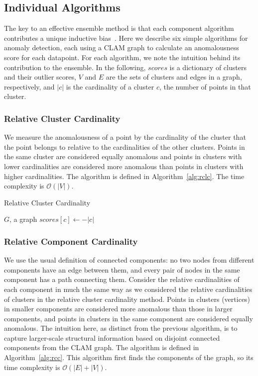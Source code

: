 \subsection{Individual Algorithms}
\label{subsec:methods:individual-algorithms}

The key to an effective ensemble method is that each component algorithm contributes a unique inductive bias~\cite{chen2017outlier}.
Here we describe six simple algorithms for anomaly detection, each using a CLAM graph to calculate an anomalousness score for each datapoint.
For each algorithm, we note the intuition behind its contribution to the ensemble.
In the following, $scores$ is a dictionary of clusters and their outlier scores,
$V$ and $E$ are the sets of clusters and edges in a graph, respectively, and $|c|$ is
the cardinality of a cluster $c$, the number of points in that cluster.


\subsubsection{Relative Cluster Cardinality}
We measure the anomalousness of a point by the cardinality of the cluster that the point belongs to relative to the cardinalities of the other clusters.
Points in the same cluster are considered equally anomalous and points in clusters with lower cardinalities are considered more anomalous than points in clusters with higher cardinalities.
The algorithm is defined in Algorithm~\ref{alg:rclc}.
The time complexity is $\mathcal{O}(|V|)$.

\begin{algorithm}[h]
    \caption{Relative Cluster Cardinality}
    \label{alg:rclc}
\begin{algorithmic}[1]
    \REQUIRE $G$, a graph
    \STATE $scores[c] \gets -|c|$
    \ENDFOR
\end{algorithmic}
\end{algorithm}


\subsubsection{Relative Component Cardinality}
We use the usual definition of connected components:
no two nodes from different components have an edge between them, and
every pair of nodes in the same component has a path connecting them.
Consider the relative cardinalities of each component in much the same way as we considered the relative cardinalities of clusters in the relative cluster cardinality method.
Points in clusters (vertices) in smaller components are considered more anomalous than those in larger components,
and points in clusters in the same component are considered equally anomalous.
The intuition here, as distinct from the previous algorithm, is to capture larger-scale structural information based on disjoint connected components from the CLAM graph.
The algorithm is defined in Algorithm~\ref{alg:rcc}.
This algorithm first finds the components of the graph, so its time complexity is $\mathcal{O}(|E| + |V|)$.

